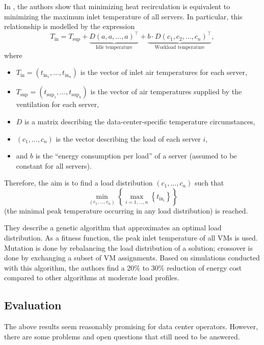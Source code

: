 \documentclass[12pt, a4paper]{scrartcl}
\begin{document}
In \cite{tang_thermal_aware_2007}, the authors show that minimizing heat recirculation is equivalent to minimizing the maximum inlet temperature of all servers.
In particular, this relationship is modelled by the expression
\[
    T_\text{in}
    = T_\text{sup}
    + \underbrace{D (a, a, \dots, a)^\intercal}_\text{Idle temperature}
    + \underbrace{b \cdot D \left( c_1, c_2, \dots, c_n \right)^\intercal}_\text{Workload temperature}
,\] 
where
\begin{itemize}[itemsep=0pt]
    \item 
        \(T_\text{in} = \left( t_{\text{in}_1}, \dots, t_{\text{in}_n} \right)\) is the vector of inlet air temperatures for each server,

    \item
        \(T_\text{sup} = \left( t_{\text{sup}_1}, \dots, t_{\text{sup}_n} \right)\) is the vector of air temperatures supplied by the ventilation for each server,

    \item
        \(D\) is a matrix describing the data-center-specific temperature circumstances,

    \item
        \(\left( c_1, \dots, c_n \right)\) is the vector describing the load of each server \(i\),

    \item
        and \(b\) is the \enquote{energy consumption per load} of a server (assumed to be constant for all servers).
\end{itemize}
Therefore, the aim is to find a load distribution \(\left( c_1, \dots, c_n \right)\) such that
\[
    \min\limits_{\left( c_1, \dots, c_n \right)}
    \left\{ \max\limits_{i = 1, \dots, n} \left\{ t_{\text{in}_i} \right\} \right\}
\] 
(the minimal peak temperature occurring in any load distribution) is reached.

They describe a genetic algorithm that approximates an optimal load distribution.
As a fitness function, the peak inlet temperature of all \acp{VM} is used.
Mutation is done by rebalancing the load distribution of a solution; crossover is done by exchanging a subset of \ac{VM} assignments.
Based on simulations conducted with this algorithm, the authors find a 20\% to 30\% reduction of energy cost compared to other algorithms at moderate load profiles.

\subsection{Evaluation}
The above results seem reasonably promising for data center operators.
However, there are some problems and open questions that still need to be answered.
\end{document}
